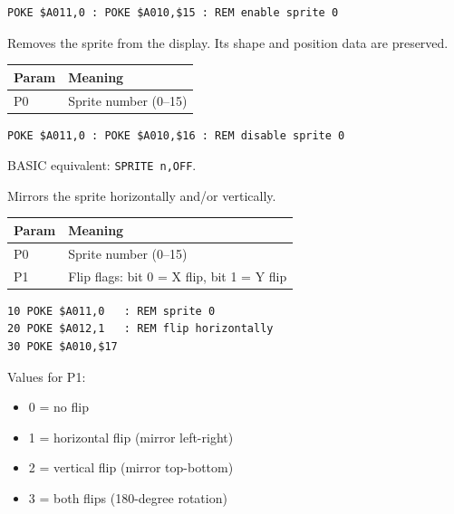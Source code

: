 \begin{lstlisting}
POKE $A011,0 : POKE $A010,$15 : REM enable sprite 0
\end{lstlisting}



Removes the sprite from the display.  Its shape and position data are
preserved.

\begin{center}
\small
\begin{tabular}{@{}ll@{}}
\toprule
\textbf{Param} & \textbf{Meaning} \\
\midrule
P0 & Sprite number (0--15) \\
\bottomrule
\end{tabular}
\end{center}

\begin{lstlisting}
POKE $A011,0 : POKE $A010,$16 : REM disable sprite 0
\end{lstlisting}

\begin{notebox}
BASIC equivalent: \texttt{SPRITE n,OFF}.
\end{notebox}



Mirrors the sprite horizontally and/or vertically.

\begin{center}
\small
\begin{tabular}{@{}ll@{}}
\toprule
\textbf{Param} & \textbf{Meaning} \\
\midrule
P0 & Sprite number (0--15) \\
P1 & Flip flags: bit 0 = X flip, bit 1 = Y flip \\
\bottomrule
\end{tabular}
\end{center}

\begin{lstlisting}
10 POKE $A011,0   : REM sprite 0
20 POKE $A012,1   : REM flip horizontally
30 POKE $A010,$17
\end{lstlisting}

Values for P1:
\begin{itemize}
  \item 0 = no flip
  \item 1 = horizontal flip (mirror left-right)
  \item 2 = vertical flip (mirror top-bottom)
  \item 3 = both flips (180-degree rotation)
\end{itemize}

